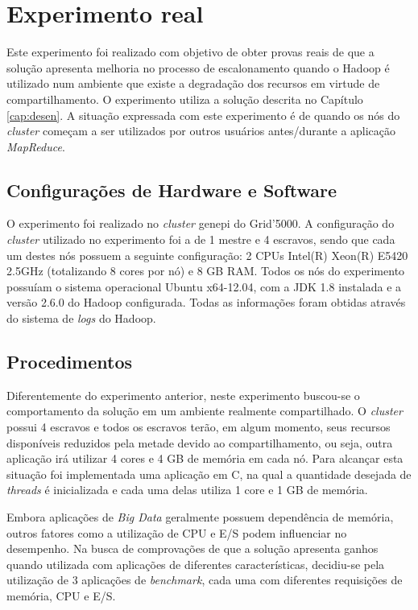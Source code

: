 \section{Experimento real}
\label{sec:expReal}
Este experimento foi realizado com objetivo de obter provas reais de que a solução apresenta melhoria no processo de escalonamento quando o Hadoop é utilizado num ambiente que existe a degradação dos recursos em virtude de compartilhamento. O experimento utiliza a solução descrita no Capítulo \ref{cap:desen}. A situação expressada com este experimento é de quando os nós do \textit{cluster} começam a ser utilizados por outros usuários antes/durante a aplicação \textit{MapReduce}.

\subsection{Configurações de Hardware e Software}
O experimento foi realizado no \textit{cluster} genepi do Grid'5000. A configuração do \textit{cluster} utilizado no experimento foi a de 1 mestre e 4 escravos, sendo que cada um destes nós possuem a seguinte configuração: 2 CPUs Intel(R) Xeon(R) E5420 2.5GHz (totalizando 8 cores por nó) e 8 GB RAM. Todos os nós do experimento possuíam o sistema operacional Ubuntu x64-12.04, com a JDK 1.8 instalada e a versão 2.6.0 do Hadoop configurada. Todas as informações foram obtidas através do sistema de \textit{logs} do Hadoop.

\subsection{Procedimentos}
Diferentemente do experimento anterior, neste experimento buscou-se o comportamento da solução em um ambiente realmente compartilhado. O \textit{cluster} possui 4 escravos e todos os escravos terão, em algum momento, seus recursos disponíveis reduzidos pela metade devido ao compartilhamento, ou seja, outra aplicação irá utilizar 4 cores e 4 GB de memória em cada nó. Para alcançar esta situação foi implementada uma aplicação em C, na qual a quantidade desejada de \textit{threads} é inicializada e cada uma delas utiliza 1 core e 1 GB de memória.

Embora aplicações de \textit{Big Data} geralmente possuem dependência de memória, outros fatores como a utilização de CPU e E/S podem influenciar no desempenho. Na busca de comprovações de que a solução apresenta ganhos quando utilizada com aplicações de diferentes características, decidiu-se pela utilização de 3 aplicações de \textit{benchmark}, cada uma com diferentes requisições de memória, CPU e E/S.

